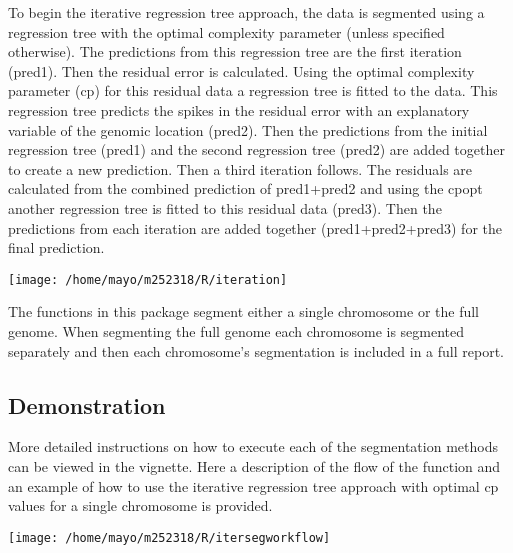\documentclass[
]{article}
\newenvironment{Shaded}{\begin{snugshade}}{\end{snugshade}}
\newcommand{\AttributeTok}[1]{\textcolor[rgb]{0.77,0.63,0.00}{#1}}
\newcommand{\FunctionTok}[1]{\textcolor[rgb]{0.00,0.00,0.00}{#1}}
\newcommand{\NormalTok}[1]{#1}
\newcommand{\OtherTok}[1]{\textcolor[rgb]{0.56,0.35,0.01}{#1}}
\newcommand{\SpecialCharTok}[1]{\textcolor[rgb]{0.00,0.00,0.00}{#1}}
\newcommand{\StringTok}[1]{\textcolor[rgb]{0.31,0.60,0.02}{#1}}
\begin{document}
To begin the iterative regression tree approach, the data is segmented
using a regression tree with the optimal complexity parameter (unless
specified otherwise). The predictions from this regression tree are the
first iteration (pred1). Then the residual error is calculated. Using
the optimal complexity parameter (cp) for this residual data a
regression tree is fitted to the data. This regression tree predicts the
spikes in the residual error with an explanatory variable of the genomic
location (pred2). Then the predictions from the initial regression tree
(pred1) and the second regression tree (pred2) are added together to
create a new prediction. Then a third iteration follows. The residuals
are calculated from the combined prediction of pred1+pred2 and using the
cpopt another regression tree is fitted to this residual data (pred3).
Then the predictions from each iteration are added together
(pred1+pred2+pred3) for the final prediction.

\begin{center}\texttt{[image: /home/mayo/m252318/R/iteration]} \end{center}

The functions in this package segment either a single chromosome or the
full genome. When segmenting the full genome each chromosome is
segmented separately and then each chromosome's segmentation is included
in a full report.

\hypertarget{demonstration}{%
\subsection{Demonstration}\label{demonstration}}

More detailed instructions on how to execute each of the segmentation
methods can be viewed in the vignette. Here a description of the flow of
the function and an example of how to use the iterative regression tree
approach with optimal cp values for a single chromosome is provided.

\begin{center}\texttt{[image: /home/mayo/m252318/R/itersegworkflow]} \end{center}

\begin{Shaded}
\end{Shaded}
\end{document}
